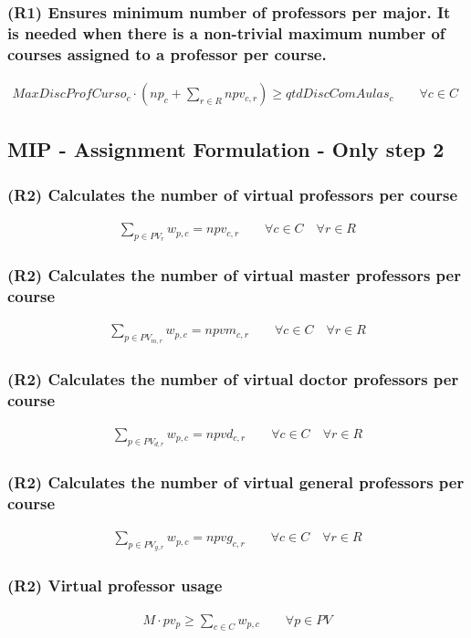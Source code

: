 \subsubsection{(R1) Ensures minimum number of professors per major. It is needed when there is a non-trivial maximum number of courses assigned to a professor per course.}
\begin{eqnarray}
MaxDiscProfCurso_{c} \cdot (np_{c} + \sum\limits_{r \in R} npv_{c,r}) \ge qtdDiscComAulas_{c} \nonumber \qquad 
\forall c \in C \quad
\end{eqnarray}


\subsection{MIP - Assignment Formulation - Only step 2}

\subsubsection{(R2) Calculates the number of virtual professors per course}
\begin{eqnarray}
\sum\limits_{p \in PV_{r}} w_{p,c} = npv_{c,r} \nonumber \qquad 
\forall c \in C \quad
\forall r \in R
\end{eqnarray}

\subsubsection{(R2) Calculates the number of virtual master professors per course}
\begin{eqnarray}
\sum\limits_{p \in PV_{m,r}} w_{p,c} = npvm_{c,r} \nonumber \qquad 
\forall c \in C \quad
\forall r \in R
\end{eqnarray}

\subsubsection{(R2) Calculates the number of virtual doctor professors per course}
\begin{eqnarray}
\sum\limits_{p \in PV_{d,r}} w_{p,c} = npvd_{c,r} \nonumber \qquad 
\forall c \in C \quad
\forall r \in R
\end{eqnarray}

\subsubsection{(R2) Calculates the number of virtual general professors per course}
\begin{eqnarray}
\sum\limits_{p \in PV_{g,r}} w_{p,c} = npvg_{c,r} \nonumber \qquad 
\forall c \in C \quad
\forall r \in R
\end{eqnarray}
      
\subsubsection{(R2) Virtual professor usage}
\begin{eqnarray}
M \cdot pv_{p} \ge \sum\limits_{c \in C} w_{p,c} \nonumber \qquad 
\forall p \in PV
\end{eqnarray}


